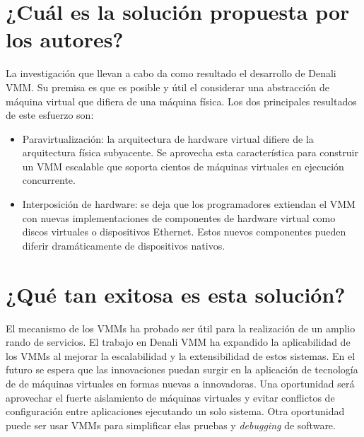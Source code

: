 \section{¿Cuál es la solución propuesta por los autores?}
La investigación que llevan a cabo da como resultado el desarrollo de Denali VMM. Su premisa es que es posible y útil el considerar una abstracción de máquina virtual que difiera de una máquina física. Los dos principales resultados de este esfuerzo son:
\begin{itemize}
    \item Paravirtualización: la arquitectura de hardware virtual difiere de la arquitectura física subyacente. Se aprovecha esta característica para construir un VMM escalable que soporta cientos de máquinas virtuales en ejecución concurrente.
    \item Interposición de hardware: se deja que los programadores extiendan el VMM con nuevas implementaciones de componentes de hardware virtual como discos virtuales o dispositivos Ethernet. Estos nuevos componentes pueden diferir dramáticamente de dispositivos nativos.
\end{itemize}     


\section{¿Qué tan exitosa es esta solución?} 
El mecanismo de los VMMs ha probado ser útil para la realización de un amplio rando de servicios. El trabajo en Denali VMM ha expandido la aplicabilidad de los VMMs al mejorar la escalabilidad y la extensibilidad de estos sistemas. En el futuro se espera que las innovaciones puedan surgir en la aplicación de tecnología de de máquinas virtuales en formas nuevas a innovadoras. Una oportunidad será aprovechar el fuerte aislamiento de máquinas virtuales y evitar conflictos de configuración entre aplicaciones ejecutando un solo sistema. Otra oportunidad puede ser usar VMMs para simplificar elas pruebas y \emph{debugging} de software.



















